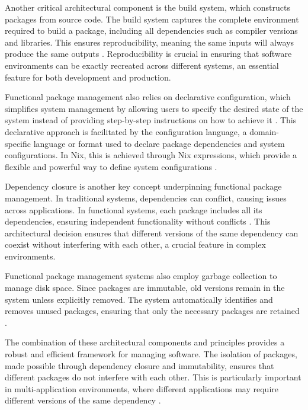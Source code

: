 Another critical architectural component is the build system, which constructs packages from
source code. The build system captures the complete environment required to build a package,
including all dependencies such as compiler versions and libraries. This ensures reproducibility,
meaning the same inputs will always produce the same outputs
\cite[Section 2.6]{dolstraPurelyFunctionalSoftware2006}. Reproducibility is crucial in ensuring
that software environments can be exactly recreated across different systems, an essential
feature for both development and production.

Functional package management also relies on declarative configuration, which simplifies system
management by allowing users to specify the desired state of the system instead of providing
step-by-step instructions on how to achieve it \cite[Section 2.2]{courtesFunctionalPackageManagement2013}.
This declarative approach is facilitated by the configuration language, a domain-specific language
or format used to declare package dependencies and system configurations. In Nix, this is
achieved through Nix expressions, which provide a flexible and powerful way to define system
configurations \cite[Chapter 2.2]{dolstraPurelyFunctionalSoftware2006}.

Dependency closure is another key concept underpinning functional package management. In traditional
systems, dependencies can conflict, causing issues across applications. In functional systems, each
package includes all its dependencies, ensuring independent functionality without conflicts
\cite[Chapter 3.3]{dolstraPurelyFunctionalSoftware2006}. This architectural decision ensures that
different versions of the same dependency can coexist without interfering with each other, a crucial
feature in complex environments.

Functional package management systems also employ garbage collection to manage disk space. Since
packages are immutable, old versions remain in the system unless explicitly removed. The system
automatically identifies and removes unused packages, ensuring that only the necessary packages
are retained \cite[Section 2.2]{courtesFunctionalPackageManagement2013}.

The combination of these architectural components and principles provides a robust and efficient
framework for managing software. The isolation of packages, made possible through dependency
closure and immutability, ensures that different packages do not interfere with each other. This
is particularly important in multi-application environments, where different applications may
require different versions of the same dependency \cite[Chapter 2.1]{dolstraPurelyFunctionalSoftware2006}.

